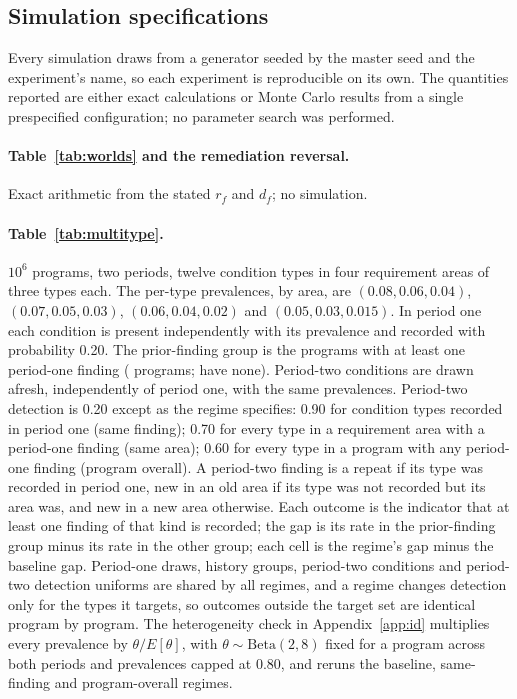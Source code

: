 \subsection{Simulation specifications}

Every simulation draws from a generator seeded by the master seed
\nBootSeed{} and the experiment's name, so each experiment is reproducible on
its own. The quantities reported are either exact calculations or Monte Carlo
results from a single prespecified configuration; no parameter search was
performed.

\paragraph{Table~\ref{tab:worlds} and the remediation reversal.} Exact
arithmetic from the stated $r_f$ and $d_f$; no simulation.

\paragraph{Table~\ref{tab:multitype}.} $10^6$ programs, two periods, twelve
condition types in four requirement areas of three types each. The
per-type prevalences, by area, are $(0.08, 0.06, 0.04)$, $(0.07, 0.05, 0.03)$,
$(0.06, 0.04, 0.02)$ and $(0.05, 0.03, 0.015)$. In period one each condition
is present independently with its prevalence and recorded with probability
0.20. The prior-finding group is the programs with at least one period-one
finding (\nMultiNprior{} programs; \nMultiNnoPrior{} have none). Period-two
conditions are drawn afresh, independently of period one, with the same
prevalences. Period-two detection is 0.20 except as the regime specifies: 0.90
for condition types recorded in period one (same finding); 0.70 for every type
in a requirement area with a period-one finding (same area); 0.60 for every
type in a program with any period-one finding (program overall). A period-two
finding is a repeat if its type was recorded in period one, new in an old area
if its type was not recorded but its area was, and new in a new area
otherwise. Each outcome is the indicator that at least one finding of that
kind is recorded; the gap is its rate in the prior-finding group minus its
rate in the other group; each cell is the regime's gap minus the baseline
gap. Period-one draws, history groups, period-two conditions and period-two
detection uniforms are shared by all regimes, and a regime changes detection
only for the types it targets, so outcomes outside the target set are
identical program by program. The heterogeneity check in
Appendix~\ref{app:id} multiplies every prevalence by $\theta/E[\theta]$, with
$\theta \sim \mathrm{Beta}(2, 8)$ fixed for a program across both periods and
prevalences capped at 0.80, and reruns the baseline, same-finding and
program-overall regimes.

